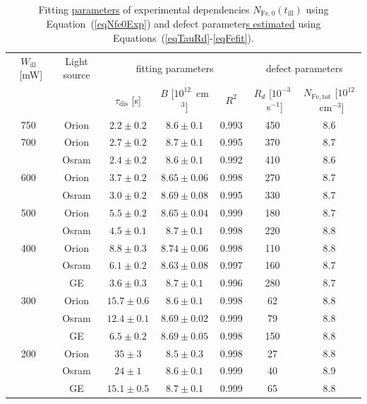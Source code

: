\documentclass{WileyMSP-template}
\begin{document}
\begin{table}
 \caption{ Fitting \textcolor[rgb]{0.00,0.07,1.00}{\uline{parameters}} of experimental dependencies $N_\mathrm{Fe,0}(t_\mathrm{ill})$
 using Equation~(\ref{eqNfe0Exp}) and defect parameter\textcolor[rgb]{0.00,0.07,1.00}{\uline{s estimated}} using Equations~(\ref{eqTauRd}-\ref{eqFefit}).
}
 \label{tb1}
  \begin{tabular}[htbp]{@{}ccccccc@{}}
    \hline
    $W_\mathrm{ill}$~[mW] & Light source & \multicolumn{3}{c}{fitting parameters}&\multicolumn{2}{c}{defect parameters} \\
     &  & $\tau_\mathrm{dis}$ [s] & \textcolor[rgb]{0.00,0.07,1.00}{\uline{$B$}} [$10^{12}$~cm$^3$] & $R^2$ & $R_d$ [$10^{-3}$~s$^{-1}$] & $N_\mathrm{Fe,tot}$ [$10^{12}$~cm$^{-3}$] \\
    \hline
    750  & Orion  & $2.2\pm0.2$ & $8.6\pm0.1$ & 0.993 &450&8.6\\
    700  & Orion  & $2.7\pm0.2$ & $8.7\pm0.1$ & 0.995 &370&8.7\\
         & Osram  & $2.4\pm0.2$ & $8.6\pm0.1$ & 0.992 &410&8.6\\
    600  & Orion  & $3.7\pm0.2$ & $8.65\pm0.06$ & 0.998&270&8.7 \\
         & Osram  & $3.0\pm0.2$ & $8.69\pm0.08$ & 0.995&330&8.7 \\
    500  & Orion  & $5.5\pm0.2$ & $8.65\pm0.04$ & 0.999&180&8.7 \\
         & Osram  & $4.5\pm0.1$ & $8.7\pm0.1$ & 0.998&220&8.8 \\
    400  & Orion  & $8.8\pm0.3$ & $8.74\pm0.06$ & 0.998&110&8.8 \\
         & Osram  & $6.1\pm0.2$ & $8.63\pm0.08$ & 0.997 &160&8.7\\
         & GE  & $3.6\pm0.3$ & $8.7\pm0.1$ & 0.996 &280&8.7\\
    300  & Orion  & $15.7\pm0.6$ & $8.6\pm0.1$ & 0.998 &62&8.8\\
         & Osram  & $12.4\pm0.1$ & $8.69\pm0.02$ & 0.999&79&8.8 \\
         & GE  & $6.5\pm0.2$ & $8.69\pm0.05$ & 0.998 &150&8.8\\
    200  & Orion  & $35\pm3$ & $8.5\pm0.3$ & 0.998 &27&8.8\\
         & Osram  & $24\pm1$ & $8.6\pm0.1$ & 0.999 &40&8.9\\
         & GE  & $15.1\pm0.5$ & $8.7\pm0.1$ & 0.999 &65&8.8\\
    \hline
  \end{tabular}
\end{table}
\end{document}

